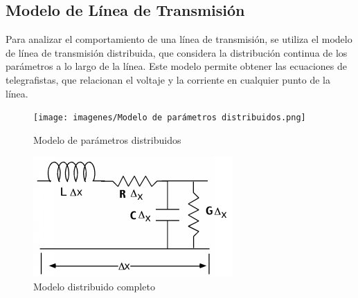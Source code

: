 \subsection{Modelo de Línea de Transmisión}

Para analizar el comportamiento de una línea de transmisión, se utiliza el modelo de línea de transmisión distribuida, que considera la distribución continua de los parámetros a lo largo de la línea. Este modelo permite obtener las ecuaciones de telegrafistas, que relacionan el voltaje y la corriente en cualquier punto de la línea.

        \begin{center}
        \begin{figure}[H]
        \centering  
        \texttt{[image: imagenes/Modelo de parámetros distribuidos.png]}
        \caption{Modelo de parámetros distribuidos}
        \end{figure}
        \end{center}

        \begin{center}
        \begin{figure}[H]
        \centering  
        \includegraphics[scale=1]{imagenes/Modelo distribuido completo.png}
        \caption{Modelo distribuido completo}
        \end{figure}
        \end{center}


